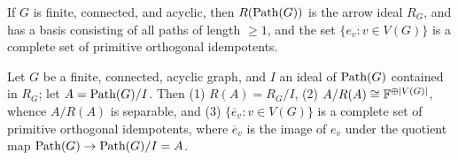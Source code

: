 \documentclass[11pt]{article}
\begin{document}
\begin{lemma} \label{lem:idempotents}
If $G$ is finite, connected, and acyclic, then $R(\text{Path}(G))$ is the arrow ideal $R_G$, and has a basis consisting of all paths of length $\geq 1$, and the set $\{e_v : v \in V(G)\}$ is a complete set of primitive orthogonal idempotents.
\end{lemma}

\begin{corollary}
Let $G$ be a finite, connected, acyclic graph, and $I$ an ideal of $\text{Path}(G)$ contained in $R_G$; let $A = \text{Path}(G) / I$. Then (1) $R(A) = R_G / I$, (2) $A/R(A) \cong \mathbb{F}^{\oplus |V(G)|}$, whence $A/R(A)$ is separable, and (3) $\{\overline{e}_v : v \in V(G)\}$ is a complete set of primitive orthogonal idempotents, where $\overline{e}_v$ is the image of $e_v$ under the quotient map $\text{Path}(G) \to \text{Path}(G) / I = A$.
\end{corollary}
\end{document}
